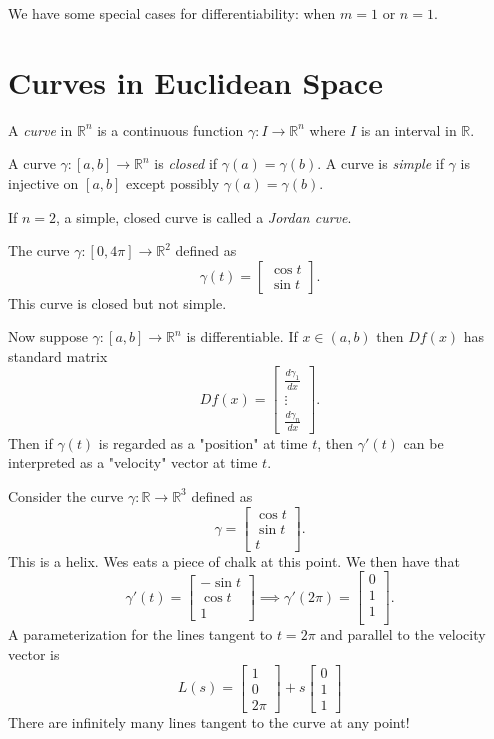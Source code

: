 \documentclass[11pt]{article}
\theoremstyle{definition}
\newcommand{\R}{\mathbb{R}}                      %
\begin{document}
We have some special cases for differentiability: when $m=1$ or $n=1$.

\section{Curves in Euclidean Space}

\begin{mdframed}[backgroundcolor = blue!10]
\vspace{+0.2cm}
 A \textit{curve} in $\R^n$ is a continuous function $\gamma:I\to\R^n$ where $I$ is an interval in $\R$.

 A curve $\gamma:[a,b]\to\R^n$ is \textit{closed} if $\gamma(a)=\gamma(b)$. A curve is \textit{simple} if $\gamma$ is injective on $[a,b]$ except possibly $\gamma(a)=\gamma(b)$.

 If $n=2$, a simple, closed curve is called a \textit{Jordan curve}.
\end{mdframed}

\ex The curve $\gamma:[0,4\pi]\to\R^2$ defined as
$$
\gamma(t)=\begin{bmatrix} \cos t\\\sin t\end{bmatrix}.
$$
This curve is closed but not simple.

Now suppose $\gamma:[a,b]\to \R^n$ is differentiable. If $x\in(a,b)$ then $Df(x)$ has  standard matrix
$$
Df(x)=\begin{bmatrix}
    \frac{d\gamma_1}{dx}\\\vdots\\\frac{d\gamma_n}{dx}
\end{bmatrix}.
$$
Then if $\gamma(t)$ is regarded as a "position" at time $t$, then $\gamma'(t)$ can be interpreted as a "velocity" vector at time $t$.

\ex Consider the curve $\gamma:\R\to\R^3$ defined as
$$
\gamma=\begin{bmatrix}
    \cos t\\ \sin t\\ t
\end{bmatrix}.
$$
This is a helix. Wes eats a piece of chalk at this point. We then have that
$$
\gamma'(t)=\begin{bmatrix}
    -\sin t\\ \cos t\\ 1
\end{bmatrix}\implies
\gamma'(2\pi)=\begin{bmatrix}
    0\\1\\1\\
\end{bmatrix}.
$$
A parameterization for the lines tangent to $t=2\pi$ and parallel to the velocity vector is
$$
L(s)=\begin{bmatrix}
    1\\ 0 \\ 2\pi
\end{bmatrix}+s\begin{bmatrix}
    0\\1\\1
\end{bmatrix}
$$
\note There are infinitely many lines tangent to the curve at any point!
\end{document}
